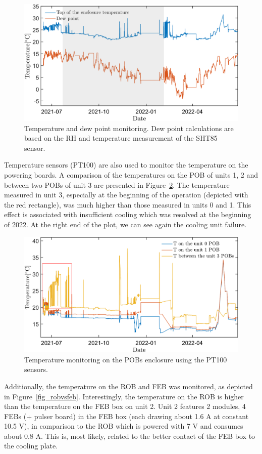 \begin{figure}[!h]
\centering
\includegraphics[width=0.9\columnwidth]{Chapter6/DCS/images/dew.png}
\caption{Temperature and dew point monitoring. Dew point calculations are based on the \gls{RH} and temperature measurement of the SHT85 sensor.}
\label{fig_dew}
\end{figure}


Temperature sensors (PT100) are also used to monitor the temperature on the powering boards. A comparison of the temperatures on the \gls{POB} of units 1, 2 and between two \glspl{POB} of unit 3 are presented in Figure~\ref{fig_POB1}. The temperature measured in unit 3, especially at the beginning of the operation (depicted with the red rectangle), was much higher than those measured in units 0 and 1. This effect is associated with insufficient cooling which was resolved at the beginning of 2022. At the right end of the plot, we can see again the cooling unit failure. 
\begin{figure}[!h]
\centering
\includegraphics[width=0.9\columnwidth]{Chapter6/DCS/images/POB1.png}
\caption{Temperature monitoring on the \glspl{POB} enclosure using the PT100 sensors.}
\label{fig_POB1}
\end{figure}

Additionally, the temperature on the \gls{ROB} and \gls{FEB} was monitored, as depicted in Figure~\ref{fig_robvsfeb}. Interestingly, the temperature on the \gls{ROB} is higher than the temperature on the \gls{FEB} box on unit 2. Unit 2 features 2 modules, 4 \gls{FEB}s (+ pulser board) in the \gls{FEB} box (each drawing about 1.6 A at constant 10.5 V), in comparison to the \gls{ROB} which is powered with 7 V and consumes about 0.8 A. This is, most likely, related to the better contact of the \gls{FEB} box to the cooling plate.

